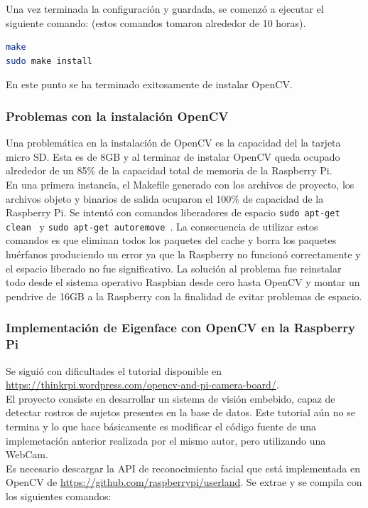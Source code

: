 \documentclass[letterpaper,12pt]{article}
\begin{document}
Una vez terminada la configuración y guardada, se comenzó a ejecutar el siguiente comando: (estos comandos tomaron alrededor de 10 horas).
\begin{lstlisting}[language=bash, frame=single]
make
sudo make install
\end{lstlisting}

En este punto se ha terminado exitosamente de instalar OpenCV. 

\subsubsection{Problemas con la instalación OpenCV}

Una problemática en la instalación de OpenCV es la capacidad del la tarjeta micro SD. Esta es de 8GB y al terminar de instalar OpenCV queda ocupado alrededor de un 85\% de la capacidad total de memoria de la Raspberry Pi. \\
En una primera instancia, el Makefile generado con los archivos de proyecto, los archivos objeto y binarios de salida ocuparon el 100\% de capacidad de la Raspberry Pi. Se intentó con comandos liberadores de espacio {\tt sudo apt-get clean } y {\tt sudo apt-get autoremove }. La consecuencia de utilizar estos comandos es que eliminan todos los paquetes del cache y borra los paquetes huérfanos produciendo un error ya que la Raspberry no funcionó correctamente y el espacio liberado no fue significativo. La solución al problema fue reinstalar todo desde el sistema operativo Raspbian desde cero hasta OpenCV y montar un pendrive de 16GB a la Raspberry con la finalidad de evitar problemas de espacio.

\subsubsection{Implementación de Eigenface con OpenCV en la Raspberry Pi}

Se siguió con dificultades el tutorial disponible en \url{https://thinkrpi.wordpress.com/opencv-and-pi-camera-board/}.\\
 El proyecto consiste en desarrollar un sistema de visión embebido, capaz de detectar rostros de sujetos presentes en la base de datos. Este tutorial aún no se termina y lo que hace básicamente es modificar el código fuente de una implemetación anterior realizada por el mismo autor, pero utilizando una WebCam.\\
 Es necesario descargar la API de reconocimiento facial que está implementada en OpenCV de \url{https://github.com/raspberrypi/userland}. Se extrae y se compila con los siguientes comandos:
 
\end{document}
